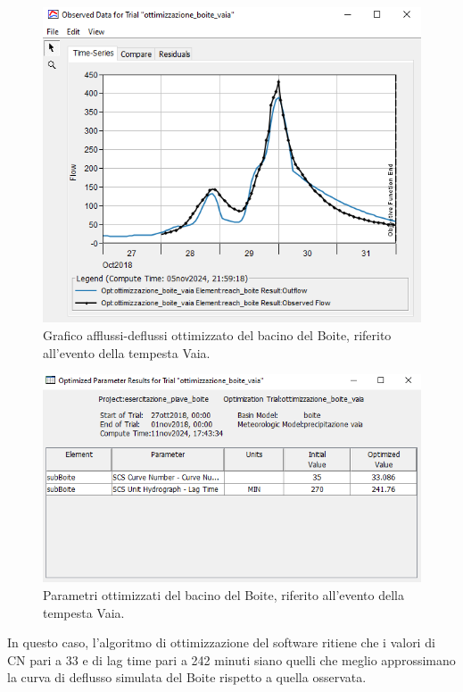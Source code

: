 \begin{figure}[H]\centering
\includegraphics[scale=1]{immagini/ottim_boite.PNG}
\caption{Grafico afflussi-deflussi ottimizzato del bacino del Boite, riferito all'evento della tempesta Vaia.}
    \label{ottim_boite}    
\end{figure}

\begin{figure}[H]\centering
    \includegraphics[scale=1]{immagini/par_ottimiz_boite.PNG}
    \caption{Parametri ottimizzati del bacino del Boite, riferito all'evento della tempesta Vaia.}
        \label{par_ottim_boite}    
    \end{figure}

In questo caso, l'algoritmo di ottimizzazione del software ritiene che i valori di CN pari a 33 e di lag time pari a 242 minuti siano quelli che meglio approssimano la curva di deflusso simulata del Boite rispetto a quella osservata.

